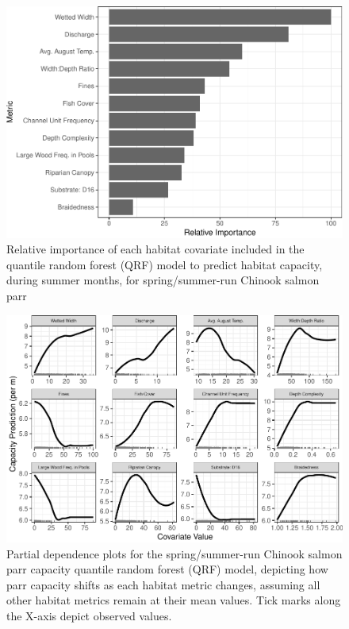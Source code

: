 \documentclass[
  12pt,
]{article}
\begin{document}
\begin{figure}
\centering
\includegraphics{../figures/rel-imp-figure-1.pdf}
\caption{\label{fig:rel-imp-figure}Relative importance of each habitat covariate included in the quantile random forest (QRF) model to predict habitat capacity, during summer months, for spring/summer-run Chinook salmon parr}
\end{figure}

\newpage

\begin{figure}
\centering
\includegraphics{../figures/pdp-figure-1.pdf}
\caption{\label{fig:pdp-figure}Partial dependence plots for the spring/summer-run Chinook salmon parr capacity quantile random forest (QRF) model, depicting how parr capacity shifts as each habitat metric changes, assuming all other habitat metrics remain at their mean values. Tick marks along the X-axis depict observed values.}
\end{figure}
\end{document}
